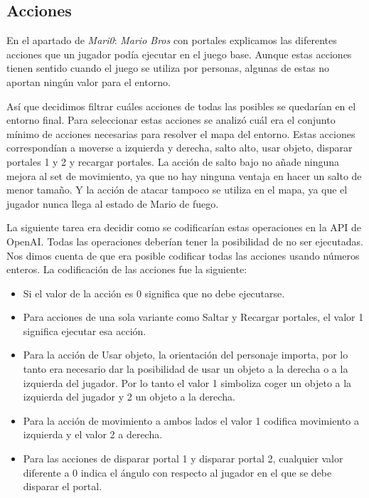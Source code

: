 \subsection{Acciones}

En el apartado de \textit{Mari0}: \textit{Mario Bros} con portales explicamos las diferentes acciones que un jugador podía ejecutar en el juego base. Aunque estas acciones tienen sentido cuando el juego se utiliza por personas, algunas de estas no aportan ningún valor para el entorno. 

Así que decidimos filtrar cuáles acciones de todas las posibles se quedarían en el entorno final. Para seleccionar estas acciones se analizó cuál era el conjunto mínimo de acciones necesarias para resolver el mapa del entorno. Estas acciones correspondían a moverse a izquierda y derecha, salto alto, usar objeto, disparar portales 1 y 2 y recargar portales. La acción de salto bajo no añade ninguna mejora al set de movimiento, ya que no hay ninguna ventaja en hacer un salto de menor tamaño. Y la acción de atacar tampoco se utiliza en el mapa, ya que el jugador nunca llega al estado de Mario de fuego.

La siguiente tarea era decidir como se codificarían estas operaciones en la API de OpenAI. Todas las operaciones deberían tener la posibilidad de no ser ejecutadas. Nos dimos cuenta de que era posible codificar todas las acciones usando números enteros. La codificación de las acciones fue la siguiente:

\begin{itemize}
	\item Si el valor de la acción es 0 significa que no debe ejecutarse.
	\item Para acciones de una sola variante como Saltar y Recargar portales, el valor 1 significa ejecutar esa acción.
 	\item Para la acción de Usar objeto, la orientación del personaje importa, por lo tanto era necesario dar la posibilidad de usar un objeto a la derecha o a la izquierda del jugador. Por lo tanto el valor 1 simboliza coger un objeto a la izquierda del jugador y 2 un objeto a la derecha.
	\item Para la acción de movimiento a ambos lados el valor 1 codifica movimiento a izquierda y el valor 2 a derecha.
	\item Para las acciones de disparar portal 1 y disparar portal 2, cualquier valor diferente a 0 indica el ángulo con respecto al jugador en el que se debe disparar el portal.
\end{itemize}

